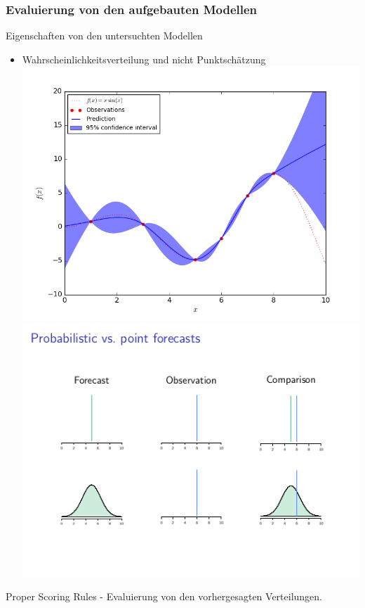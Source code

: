 \documentclass[18pt]{beamer}
\begin{document}
\begin{frame}
  \frametitle{Evaluierung von den aufgebauten Modellen}
  Eigenschaften von den untersuchten Modellen
  \begin{itemize}
  \item Wahrscheinlichkeitsverteilung und nicht Punktschätzung
    \includegraphics[scale=0.2]{images/graph_1}
    \includegraphics[scale=0.4]{images/graph_2}
  \end{itemize}
  Proper Scoring Rules - Evaluierung von den vorhergesagten Verteilungen.
\end{frame}
\end{document}
